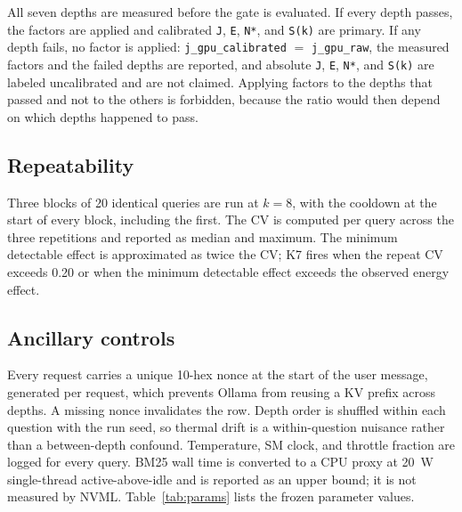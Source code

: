 \documentclass[a4paper,fleqn]{cas-sc}
\begin{document}
All seven depths are measured before the gate is evaluated. If every depth passes, the factors
are applied and calibrated \texttt{J}, \texttt{E}, \texttt{N*}, and \texttt{S(k)} are primary.
If any depth fails, no factor is applied: \texttt{j\_gpu\_calibrated} $=$
\texttt{j\_gpu\_raw}, the measured factors and the failed depths are reported, and absolute
\texttt{J}, \texttt{E}, \texttt{N*}, and \texttt{S(k)} are labeled uncalibrated and are not
claimed. Applying factors to the depths that passed and not to the others is forbidden, because
the ratio would then depend on which depths happened to pass.

\subsection{Repeatability}\label{sec:s1-repeat}

Three blocks of 20 identical queries are run at $k=8$, with the cooldown at the start of every
block, including the first. The CV is computed per query across the three repetitions and
reported as median and maximum. The minimum detectable effect is approximated as twice the CV;
K7 fires when the repeat CV exceeds 0.20 or when the minimum detectable effect exceeds the
observed energy effect.

\subsection{Ancillary controls}

Every request carries a unique 10-hex nonce at the start of the user message, generated per
request, which prevents Ollama from reusing a KV prefix across depths. A missing nonce
invalidates the row. Depth order is shuffled within each question with the run seed, so thermal
drift is a within-question nuisance rather than a between-depth confound. Temperature, SM clock,
and throttle fraction are logged for every query. BM25 wall time is converted to a CPU proxy at
20~W single-thread active-above-idle and is reported as an upper bound; it is not measured by
NVML. Table~\ref{tab:params} lists the frozen parameter values.
\end{document}
